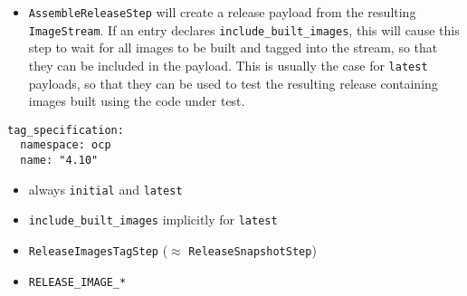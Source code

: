\begin{frame}[fragile]
{\begin{itemize}
            \item
                \texttt{AssembleReleaseStep} will create a release payload from
                the resulting \texttt{ImageStream}.  If an entry declares
                \texttt{include\_built\_images}, this will cause this step to
                wait for all images to be built and tagged into the stream,
                so that they can be included in the payload.  This is usually
                the case for \texttt{latest} payloads, so that they can be used
                to test the resulting release containing images built using the
                code under test.
        \end{itemize}
    }
\end{frame}

\begin{frame}[fragile]
    \autotitle
    \setlength{\columnsep}{0pt}
    \begin{multicols}{2}
        \vspace*{\fill}
        \begin{verbatim}
tag_specification:
  namespace: ocp
  name: "4.10"
        \end{verbatim}
        \vfill
        \columnbreak
        \begin{itemize}
            \item always \texttt{initial} and \texttt{latest}
            \item \texttt{include\_built\_images} implicitly for \texttt{latest}
            \item
                \texttt{ReleaseImagesTagStep} ($\approx$
                \texttt{ReleaseSnapshotStep})
            \item \texttt{RELEASE\_IMAGE\_*}
        \end{itemize}
    \end{multicols}
\end{frame}

